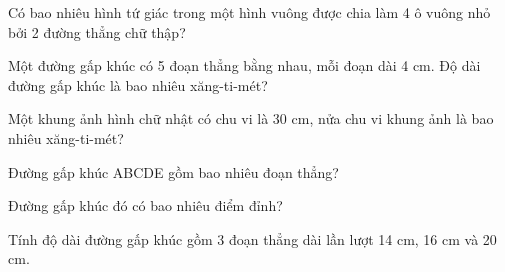 \begin{ex}
Có bao nhiêu hình tứ giác trong một hình vuông được chia làm 4 ô vuông nhỏ bởi 2 đường thẳng chữ thập?
\end{ex}

\begin{ex}
Một đường gấp khúc có 5 đoạn thẳng bằng nhau, mỗi đoạn dài 4 cm. Độ dài đường gấp khúc là bao nhiêu xăng-ti-mét?
\end{ex}

\begin{ex}
Một khung ảnh hình chữ nhật có chu vi là 30 cm, nửa chu vi khung ảnh là bao nhiêu xăng-ti-mét?
\end{ex}

\begin{ex}
Đường gấp khúc ABCDE gồm bao nhiêu đoạn thẳng?
\end{ex}

\begin{ex}
Đường gấp khúc đó có bao nhiêu điểm đỉnh?
\end{ex}

\begin{ex}
Tính độ dài đường gấp khúc gồm 3 đoạn thẳng dài lần lượt 14 cm, 16 cm và 20 cm.
\end{ex}
